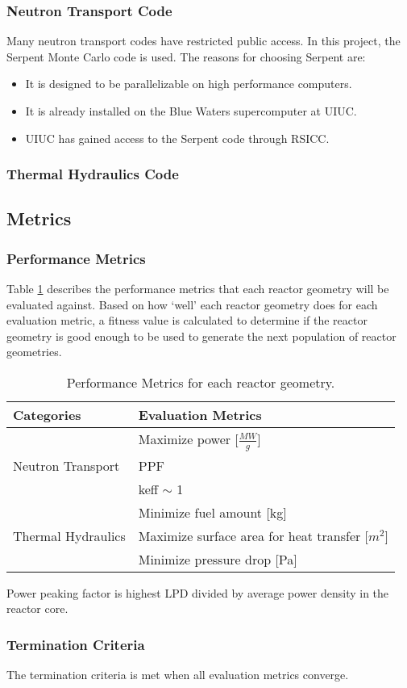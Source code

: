 \subsubsection{Neutron Transport Code}
Many neutron transport codes have restricted public access. 
In this project, the Serpent Monte Carlo code is used. 
The reasons for choosing Serpent are: 
\begin{itemize}
    \item It is designed to be parallelizable on high performance 
    computers. 
    \item It is already installed on the Blue Waters supercomputer at UIUC. 
    \item UIUC has gained access to the Serpent code through RSICC. 
\end{itemize}

\subsubsection{Thermal Hydraulics Code}

\subsection{Metrics}

\subsubsection{Performance Metrics}
Table \ref{tab:eval-metric} describes the performance metrics that each 
reactor geometry will be evaluated against. 
Based on how `well' each reactor geometry does for each evaluation metric, 
a fitness value is calculated to determine if the reactor geometry is good 
enough to be used to generate the next population of reactor geometries. 

\begin{table}[!htbp]
    \caption{Performance Metrics for each reactor geometry.}
    \label{tab:eval-metric}
    \centering
    \doublespacing
    \small
    \begin{tabular}{ll}
    \hline
    \textbf{Categories} & \textbf{Evaluation Metrics}\\ \hline
    & Maximize power [$\frac{MW}{g}$] \\
    Neutron Transport & \gls{PPF} \\ 
    & keff $\sim$ 1 \\ 
    & Minimize fuel amount [kg] \\ \hline
    Thermal Hydraulics & Maximize surface area for heat transfer [$m^2$]\\ 
    & Minimize pressure drop [Pa]\\ \hline 
    \end{tabular}
\end{table}

Power peaking factor is highest \gls{LPD} divided by average power density in 
the reactor core. 

\subsubsection{Termination Criteria}
The termination criteria is met when all evaluation metrics converge. 
